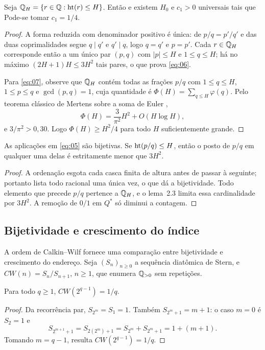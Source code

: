 \begin{lema}
Seja $\mathbb Q_H=\{r\in\mathbb Q:\operatorname{ht}(r)\le H\}$. Então
e existem $H_0$ e $c_1>0$ universais tais que
Pode-se tomar $c_1=1/4$.
\end{lema}
\begin{proof}
A forma reduzida com denominador positivo é única: de $p/q=p'/q'$ e das duas coprimalidades segue $q\mid q'$ e $q'\mid q$, logo $q=q'$ e $p=p'$. Cada $r\in\mathbb Q_H$ corresponde então a um único par $(p,q)$ com $|p|\le H$ e $1\le q\le H$; há no máximo $(2H+1)H\le3H^2$ tais pares, o que prova \eqref{eq:06}.

Para \eqref{eq:07}, observe que $\mathbb Q_H$ contém todas as frações $p/q$ com $1\le q\le H$, $1\le p\le q$ e $\gcd(p,q)=1$, cuja quantidade é $\Phi(H)=\sum_{q\le H}\varphi(q)$. Pelo teorema clássico de Mertens sobre a soma de Euler \citep[Teorema 330]{hardy2008},
\[
\Phi(H)=\frac3{\pi^2}H^2+O(H\log H),
\]
e $3/\pi^2>0{,}30$. Logo $\Phi(H)\ge H^2/4$ para todo $H$ suficientemente grande.
\end{proof}

\begin{lema}
As aplicações em \eqref{eq:05} são bijetivas. Se $\operatorname{ht}(p/q)\le H$, então o posto de $p/q$ em qualquer uma delas é estritamente menor que $3H^2$.
\end{lema}
\begin{proof}
A ordenação esgota cada casca finita de altura antes de passar à seguinte; portanto lista todo racional uma única vez, o que dá a bijetividade. Todo elemento que precede $p/q$ pertence a $\mathbb Q_H$, e o lema~2.3 limita essa cardinalidade por $3H^2$. A remoção de $0/1$ em $Q^*$ só diminui a contagem.
\end{proof}

\subsection{Bijetividade e crescimento do índice}
A ordem de Calkin--Wilf fornece uma comparação entre bijetividade e crescimento do endereço. Seja $(S_n)_{n\ge0}$ a sequência diatômica de Stern,
e $CW(n)=S_n/S_{n+1}$, $n\ge1$, que enumera $\mathbb Q_{>0}$ sem repetições.
\begin{lema}
Para todo $q\ge1$, $CW(2^{q-1})=1/q$.
\end{lema}
\begin{proof}
Da recorrência par, $S_{2^m}=S_1=1$. Também $S_{2^m+1}=m+1$: o caso $m=0$ é $S_2=1$ e
\[
S_{2^{m+1}+1}=S_{2(2^m)+1}=S_{2^m}+S_{2^m+1}=1+(m+1).
\]
Tomando $m=q-1$, resulta $CW(2^{q-1})=1/q$.
\end{proof}

